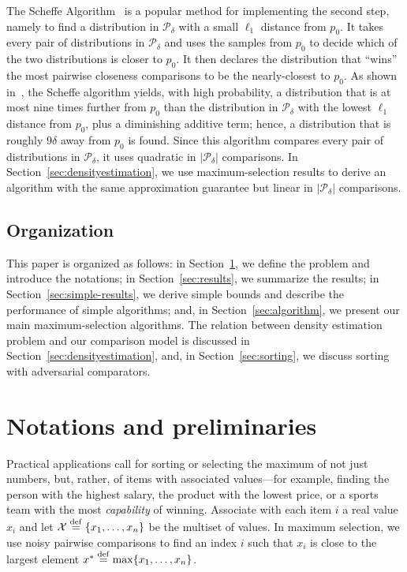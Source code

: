 \documentclass[twoside,11pt]{article}
\newcommand{\df}[1][\rm{def}]{\stackrel{#1}{=}}
\newcommand{\cX}{\mathcal{X}}
\newcommand{\cP}{\mathcal{P}}
\newcommand{\maxx}{x^*}
\newcommand{\deltacover}{\delta}
\begin{document}
The Scheffe Algorithm~\citep{Scheffe47, DevroyeL01} is a popular method
for implementing the second step, namely to find a distribution in
$\cP_{\deltacover}$ with a small $\ell_1$ distance from $p_0$.  It
takes every pair of distributions in $\cP_\deltacover$ and uses the
samples from $p_0$ to decide which of the two distributions is closer
to $p_0$.  It then declares the distribution that ``wins'' the most
pairwise closeness comparisons to be the nearly-closest
to $p_0$.  As shown in~\citet{DevroyeL01}, the
Scheffe algorithm yields, with high probability, a distribution that is at most nine times
further from $p_0$ than the distribution in $\cP_\deltacover$
  with the lowest $\ell_1$ distance from $p_0$, plus a diminishing
  additive term; hence, a distribution that is roughly $9\delta$
  away from $p_0$ is found. Since this algorithm compares every pair of
  distributions in $\cP_\deltacover$, it uses quadratic in
  $|\cP_\deltacover|$ comparisons.  In Section~\ref{sec:densityestimation}, we
use maximum-selection results to derive an algorithm with the same
approximation guarantee but linear in
$|\cP_\deltacover|$ comparisons.

\subsection{Organization}
This paper is organized as follows:  in
Section~\ref{sec:problemstatement}, we define the problem and introduce
the notations; in Section~\ref{sec:results}, we summarize the results;
  in Section~\ref{sec:simple-results}, we derive simple bounds and
  describe the performance of simple algorithms; and, in
  Section~\ref{sec:algorithm}, we present our main maximum-selection
  algorithms.  The relation between density estimation problem and our
  comparison model is discussed in
  Section~\ref{sec:densityestimation}, and, in
  Section~\ref{sec:sorting}, we discuss sorting with adversarial
  comparators.

\section{Notations and preliminaries}
\label{sec:problemstatement}
Practical applications call for sorting or selecting the maximum of
not just numbers, but, rather, of items with associated
values---for example, finding the person with the highest
salary, the product with the lowest price, or a sports team with
  the most \emph{capability} of winning. 
Associate with each item $i$ a real value
  $x_i$ and let $\cX\df\{x_1,\ldots,x_n\}$ be the multiset of
values.  In maximum selection, we use noisy pairwise comparisons to
find an index $i$ such that $x_i$ is close to the largest element
$\maxx\df\max\{x_1,\ldots,x_n\}$.
\end{document}
